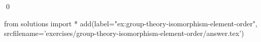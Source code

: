 
\begin{ex} 
  \label{ex:group-theory-isomorphism-element-order}
  
  \qed
\end{ex} 
\begin{python0}
from solutions import *
add(label="ex:group-theory-isomorphism-element-order",
    srcfilename='exercises/group-theory-isomorphism-element-order/answer.tex') 
\end{python0}
